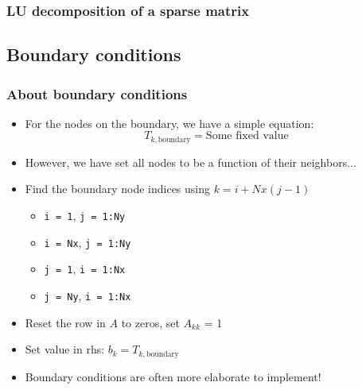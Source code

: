 \documentclass[11pt,table,final,xcolor={usenames,dvipsnames,table}]{beamer}
\begin{document}
\begin{frame}[fragile]
  \frametitle{LU decomposition of a sparse matrix}
\end{frame}

\subsection*{Boundary conditions}
\begin{frame}[fragile]
  \frametitle{About boundary conditions}
  \begin{itemize}
   \item For the nodes on the boundary, we have a simple equation:
    \[
      T_{k,\text{boundary}} = \text{Some fixed value}
    \]
    \item However, we have set all nodes to be a function of their neighbors...
    \item Find the boundary node indices using $k = i + Nx(j-1)$
    \begin{itemize}
      \item \lstinline$i = 1$, \lstinline$j = 1:Ny$
      \item \lstinline$i = Nx$, \lstinline$j = 1:Ny$
      \item \lstinline$j = 1$, \lstinline$i = 1:Nx$
      \item \lstinline$j = Ny$, \lstinline$i = 1:Nx$
    \end{itemize}
    \item Reset the row in $A$ to zeros, set $A_{kk}$ = 1
    \item Set value in rhs: $b_k = T_{k,\text{boundary}}$
    \item Boundary conditions are often more elaborate to implement!
  \end{itemize}
\end{frame}
\end{document}
